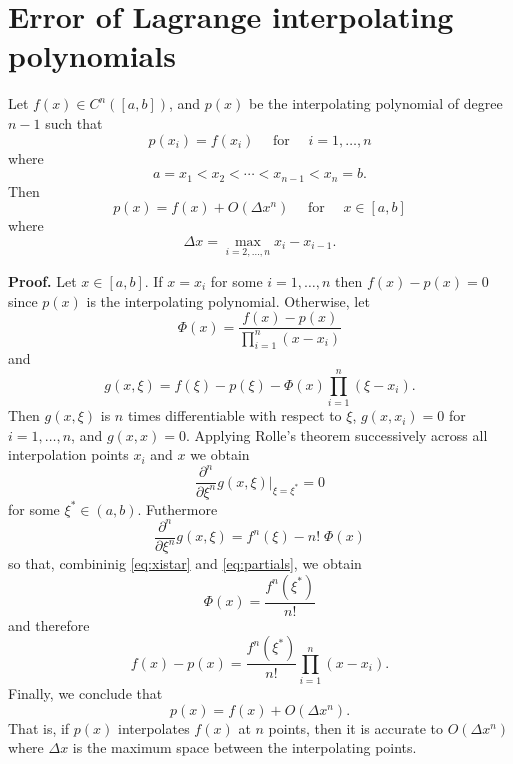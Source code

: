 \documentclass{article}
\newcommand{\for}[0]{\quad \text{ for } \quad}
\numberwithin{equation}{section}
\begin{document}

\newpage
\appendix
\section{Error of Lagrange interpolating polynomials}
\label{app:lagrange}

Let $f(x) \in C^{n}([a,b])$, and $p(x)$ be the interpolating
polynomial of degree $n-1$ such that
\begin{equation}
  p(x_i) = f(x_i) \for i=1,\ldots,n
\end{equation}
where
\begin{equation}
  a = x_1 < x_2 < \cdots < x_{n-1} < x_n = b.
\end{equation}
Then
\begin{equation}
  p(x) = f(x) + O(\Delta x^n) \for x \in [a,b]
\end{equation}
where
\begin{equation}
  \Delta x = \max_{i=2,\ldots,n} x_i - x_{i-1}.
\end{equation}

\textbf{Proof.}  Let $x \in [a,b]$.  If $x = x_i$ for some
$i=1,\ldots,n$ then $f(x) - p(x) = 0$ since $p(x)$ is the
interpolating polynomial.  Otherwise, let
\begin{equation}
  \Phi(x) = \frac{f(x) - p(x)}{\prod_{i=1}^n (x - x_i)}
\end{equation}
and
\begin{equation}
  g(x,\xi) = f(\xi) - p(\xi) - \Phi(x) \prod_{i=1}^n (\xi - x_i).
\end{equation}
Then $g(x,\xi)$ is $n$ times differentiable with respect to $\xi$,
$g(x,x_i) = 0$ for $i=1,\ldots,n$, and $g(x,x) = 0$.  Applying Rolle's
theorem successively across all interpolation points $x_i$ and $x$ we
obtain
\begin{equation}
  \label{eq:xistar}
  \frac{\partial^n}{\partial \xi^n} g(x,\xi)\biggr|_{\xi=\xi^*} = 0
\end{equation}
for some $\xi^* \in (a,b)$.  Futhermore
\begin{equation}
  \label{eq:partials}
  \frac{\partial^n}{\partial \xi^n} g(x,\xi) = f^n(\xi) - n!\;\Phi(x)
\end{equation}
so that, combininig \eqref{eq:xistar} and \eqref{eq:partials}, we obtain
\begin{equation}
  \Phi(x) = \frac{f^n(\xi^*)}{n!}
\end{equation}
and therefore
\begin{equation}
  f(x) - p(x) = \frac{f^n(\xi^*)}{n!} \prod_{i=1}^n (x - x_i).
\end{equation}
Finally, we conclude that
\begin{equation}
  p(x) = f(x) + O(\Delta x^n).
\end{equation}
That is, if $p(x)$ interpolates $f(x)$ at $n$ points, then it is
accurate to $O(\Delta x^n)$ where $\Delta x$ is the maximum space
between the interpolating points.
\end{document}
